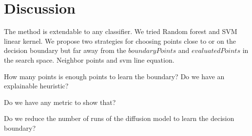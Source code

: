 \section{Discussion}

The method is extendable to any classifier. We tried Random forest and SVM linear kernel.
We propose two strategies for choosing points close to or on the decision boundary but far away from the $boundaryPoints$ and $evaluatedPoints$ in the search space. Neighbor points and svm line equation.

How many points is enough points to learn the boundary? Do we have an explainable heuristic?

Do we have any metric to show that?

Do we reduce the number of runs of the diffusion model to learn the decision boundary?
